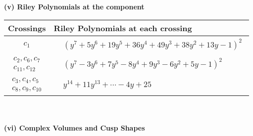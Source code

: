 \documentclass[1p]{elsarticle_modified}
\theoremstyle{definition}
\begin{document}
\newpage\renewcommand{\arraystretch}{1}
\flushleft \textbf{(v) Riley Polynomials at the component}\newline \\
\begin{tabular}{m{50pt}|m{274pt}}
Crossings & \hspace{64pt}Riley Polynomials at each crossing \\
\hline $$\begin{aligned}c_{1}\end{aligned}$$&$\begin{aligned}
&(y^7+5 y^6+19 y^5+36 y^4+49 y^3+38 y^2+13 y-1)^2
\end{aligned}$\\
\hline $$\begin{aligned}c_{2},c_{6},c_{7}\\c_{11},c_{12}\end{aligned}$$&$\begin{aligned}
&(y^7-3 y^6+7 y^5-8 y^4+9 y^3-6 y^2+5 y-1)^2
\end{aligned}$\\
\hline $$\begin{aligned}c_{3},c_{4},c_{5}\\c_{8},c_{9},c_{10}\end{aligned}$$&$\begin{aligned}
&y^{14}+11 y^{13}+\cdots-4 y+25
\end{aligned}$\\
\hline
\end{tabular}\\~\\
\newpage\flushleft \textbf{(vi) Complex Volumes and Cusp Shapes}
\end{document}
